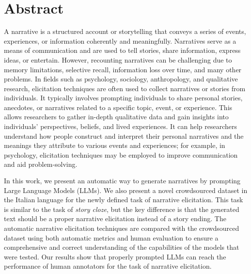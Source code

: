 \chapter*{Abstract} %
\label{abtract}


    A narrative is a structured account or storytelling that conveys a series of events, experiences, or information coherently and meaningfully. Narratives serve as a means of communication and are used to tell stories, share information, express ideas, or entertain. However, recounting narratives can be challenging due to memory limitations, selective recall, information loss over time, and many other problems. In fields such as psychology, sociology, anthropology, and qualitative research, elicitation techniques are often used to collect narratives or stories from individuals. It typically involves prompting individuals to share personal stories, anecdotes, or narratives related to a specific topic, event, or experience. This allows researchers to gather in-depth qualitative data and gain insights into individuals' perspectives, beliefs, and lived experiences. It can help researchers understand how people construct and interpret their personal narratives and the meanings they attribute to various events and experiences; for example, in psychology, elicitation techniques may be employed to improve communication and aid problem-solving.

In this work, we present an automatic way to generate narratives by prompting Large Language Models (LLMs). We also present a novel crowdsourced dataset in the Italian language for the newly defined task of narrative elicitation. This task is similar to the task of \emph{story cloze}, but the key difference is that the generated text should be a proper narrative elicitation instead of a story ending. The automatic narrative elicitation techniques are compared with the crowdsourced dataset using both automatic metrics and human evaluation to ensure a comprehensive and correct understanding of the capabilities of the models that were tested. Our results show that properly prompted LLMs can reach the performance of human annotators for the task of narrative elicitation.



